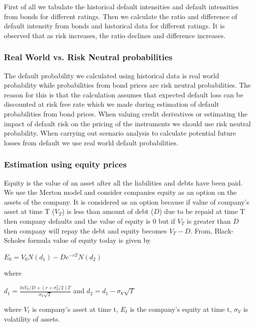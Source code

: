 \documentclass[11pt]{article}
\numberwithin{equation}{section}
\begin{document}
First of all we tabulate the historical default intensities and default intensities from bonds for different ratings. Then we calculate the ratio and difference of default intensity from bonds and historical data for different ratings. It is observed that as risk increases, the ratio declines and difference increases.

\subsubsection{Real World vs. Risk Neutral probabilities}
\medskip

The default probability we calculated using historical data is real world probability while probabilities from bond prices are risk neutral probabilities. The reason for this is that the calculation assumes that expected default loss can be discounted at risk free rate which we made during estimation of default probabilities from bond prices. When valuing credit derivatives or estimating the impact of default risk on the pricing of the instruments we should use risk neutral probability. When carrying out scenario analysis to calculate potential future losses from default we use real world default probabilities.

\subsubsection{Estimation using equity prices}
\medskip

Equity is the value of an asset after all the liabilities and debts have been paid. We use the Merton model and consider companies equity as an option on the assets of the company. It is considered as an option because if value of company's asset at time T ($ V_T $) is less than amount of debt ($ D $) due to be repaid at time T then company defaults and the value of equity is 0 but if $V_T$ is greater than $ D $ then company will repay the debt and equity becomes $V_T-D$. From, Black-Scholes formula value of equity today is given by 
\begin{center}
	$ E_0 = V_0 N(d_1) - De^{-rT} N(d_2)$
\end{center}  
where
\begin{center}
	$ d_1= \frac{ln {V_0}/{D} + (r+\sigma_V^{2}/2)T}{\sigma_V \sqrt{T}} $ and $ d_2 = d_1 - \sigma_V \sqrt{T}$
\end{center}
where $V_t$ is company's asset at time t, $E_t$ is the company's equity at time t, $\sigma_V $ is volatility of assets.\medskip
\end{document}
